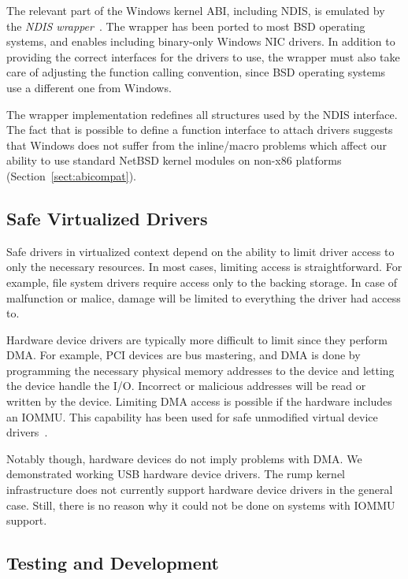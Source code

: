 The relevant part of the Windows kernel ABI, including NDIS, is
emulated by the \textit{NDIS wrapper}~\cite{ndis:fbman4}.  The
wrapper has been ported to most BSD operating systems, and enables
including binary-only Windows NIC drivers.  In addition to providing
the correct interfaces for the drivers to use, the wrapper must also
take care of adjusting the function calling convention, since BSD
operating systems use a different one from Windows.

The wrapper implementation redefines all structures used by the NDIS
interface.  The fact that is possible to
define a function interface to attach drivers suggests that
Windows does not suffer from the inline/macro problems which affect
our ability to use standard NetBSD kernel modules on non-x86
platforms (Section~\ref{sect:abicompat}).


\subsection{Safe Virtualized Drivers}

Safe drivers in virtualized context depend on the ability to limit
driver access to only the necessary resources.  In most cases, limiting access
is straightforward.  For example, file system drivers require access
only to the backing storage.  In case of malfunction or malice,
damage will be limited to everything the driver had access to.

Hardware device drivers are typically more difficult to limit
since they perform DMA.  For example, PCI devices are bus
mastering, and DMA is done by programming the necessary physical
memory addresses to the device and letting the device handle the
I/O.  Incorrect or malicious addresses will be read or written by
the device.  Limiting DMA access is possible if the hardware includes
an IOMMU.  This capability has been used for safe unmodified virtual
device drivers~\cite{levasseur:driverreuse}.

Notably though, hardware devices do not imply problems with DMA.
We demonstrated working USB hardware device drivers.  The rump
kernel infrastructure does not currently support hardware device drivers
in the general case.  Still, there is no reason why it could not be done
on systems with IOMMU support.

\subsection{Testing and Development}

